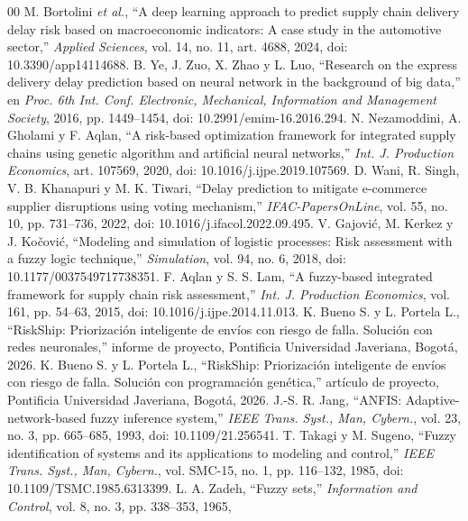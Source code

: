 \documentclass[conference]{IEEEtran}
\begin{document}
\begin{thebibliography}{00}
 M. Bortolini \textit{et al.}, ``A deep learning approach to
predict supply chain delivery delay risk based on macroeconomic indicators: A
case study in the automotive sector,'' \textit{Applied Sciences}, vol. 14,
no. 11, art. 4688, 2024, doi: 10.3390/app14114688.
 B. Ye, J. Zuo, X. Zhao y L. Luo, ``Research on the express
delivery delay prediction based on neural network in the background of big
data,'' en \textit{Proc. 6th Int. Conf. Electronic, Mechanical, Information
and Management Society}, 2016, pp. 1449--1454, doi: 10.2991/emim-16.2016.294.
 N. Nezamoddini, A. Gholami y F. Aqlan, ``A risk-based
optimization framework for integrated supply chains using genetic algorithm
and artificial neural networks,'' \textit{Int. J. Production Economics},
art. 107569, 2020, doi: 10.1016/j.ijpe.2019.107569.
 D. Wani, R. Singh, V. B. Khanapuri y M. K. Tiwari,
``Delay prediction to mitigate e-commerce supplier
disruptions using voting mechanism,'' \textit{IFAC-PapersOnLine}, vol. 55,
no. 10, pp. 731--736, 2022, doi: 10.1016/j.ifacol.2022.09.495.
 V. Gajović, M. Kerkez y J. Kočović, ``Modeling and
simulation of logistic processes: Risk assessment with a fuzzy logic
technique,'' \textit{Simulation}, vol. 94, no. 6, 2018,
doi: 10.1177/0037549717738351.
 F. Aqlan y S. S. Lam, ``A fuzzy-based integrated framework for
supply chain risk assessment,'' \textit{Int. J. Production Economics},
vol. 161, pp. 54--63, 2015, doi: 10.1016/j.ijpe.2014.11.013.
 K. Bueno S. y L. Portela L., ``RiskShip: Priorización
inteligente de envíos con riesgo de falla. Solución con redes neuronales,''
informe de proyecto, Pontificia Universidad Javeriana, Bogotá, 2026.
 K. Bueno S. y L. Portela L., ``RiskShip: Priorización
inteligente de envíos con riesgo de falla. Solución con programación
genética,'' artículo de proyecto, Pontificia Universidad Javeriana, Bogotá,
2026.
 J.-S. R. Jang, ``ANFIS: Adaptive-network-based fuzzy inference
system,'' \textit{IEEE Trans. Syst., Man, Cybern.}, vol. 23, no. 3,
pp. 665--685, 1993, doi: 10.1109/21.256541.
 T. Takagi y M. Sugeno, ``Fuzzy identification of systems and
its applications to modeling and control,'' \textit{IEEE Trans. Syst., Man,
Cybern.}, vol. SMC-15, no. 1, pp. 116--132, 1985,
doi: 10.1109/TSMC.1985.6313399.
 L. A. Zadeh, ``Fuzzy sets,'' \textit{Information and
Control}, vol. 8, no. 3, pp. 338--353, 1965,

\end{thebibliography}
\end{document}
